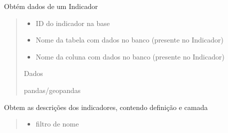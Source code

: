 \documentclass[letterpaper,10pt,brazil]{sphinxmanual}
\begin{document}
\begin{fulllineitems}
\begin{fulllineitems}
\label{\detokenize{api_gen/apiModulo.api_consulta:apiModulo.api_consulta.ApiConsulta.obterIndicador}}
\pysigstartsignatures
{}
\pysigstopsignatures
\sphinxAtStartPar
Obtém dados de um Indicador
\begin{quote}\begin{description}
\begin{itemize}
\item {} 
\sphinxAtStartPar
{} \textendash{} ID do indicador na base

\item {} 
\sphinxAtStartPar
{} \textendash{} Nome da tabela com dados no banco (presente no Indicador)

\item {} 
\sphinxAtStartPar
{} \textendash{} Nome da coluna com dados no banco (presente no Indicador)

\end{itemize}

\sphinxAtStartPar
Dados

\sphinxAtStartPar
pandas/geopandas

\end{description}\end{quote}

\end{fulllineitems}


\begin{fulllineitems}
\label{\detokenize{api_gen/apiModulo.api_consulta:apiModulo.api_consulta.ApiConsulta.obterMetadados}}
\pysigstartsignatures
{}
\pysigstopsignatures
\sphinxAtStartPar
Obtem as descrições dos indicadores, contendo definição e camada
\begin{quote}\begin{description}
\begin{itemize}
\item {} 
\sphinxAtStartPar
{} \textendash{} filtro de nome


\end{itemize}
\end{description}
\end{quote}
\end{fulllineitems}
\end{fulllineitems}
\end{document}
